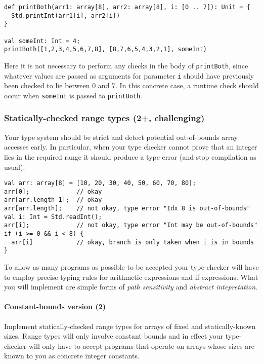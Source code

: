 \begin{lstlisting}
def printBoth(arr1: array[8], arr2: array[8], i: [0 .. 7]): Unit = {
  Std.printInt(arr1[i], arr2[i])
}

val someInt: Int = 4;
printBoth([1,2,3,4,5,6,7,8], [8,7,6,5,4,3,2,1], someInt)
\end{lstlisting}

Here it is not necessary to perform any checks in the body of \lstinline{printBoth}, since
whatever values are passed as arguments for parameter \lstinline{i} should have previously
been checked to lie between 0 and 7.
In this concrete case, a runtime check should occur when \lstinline{someInt} is passed to
\lstinline{printBoth}.


\subsubsection{Statically-checked range types (2+, challenging)}

Your type system should be strict and detect potential out-of-bounds array accesses
early. In particular, when your type checker cannot prove that an integer lies in the
required range it should produce a type error (and stop compilation as usual).

\begin{lstlisting}
val arr: array[8] = [10, 20, 30, 40, 50, 60, 70, 80];
arr[0];             // okay
arr[arr.length-1];  // okay
arr[arr.length];    // not okay, type error "Idx 8 is out-of-bounds"
val i: Int = Std.readInt();
arr[i];             // not okay, type error "Int may be out-of-bounds"
if (i >= 0 && i < 8) {
  arr[i]            // okay, branch is only taken when i is in bounds
}
\end{lstlisting}

To allow as many programs as possible to be accepted your type-checker will have to
employ precise typing rules for arithmetic expressions and if-expressions.
What you will implement are simple forms of \emph{path sensitivity} and
\emph{abstract intepretation}.


\paragraph{Constant-bounds version (2)}

Implement statically-checked range types for arrays of fixed and statically-known sizes.
Range types will only involve constant bounds and in effect your type-checker will only
have to accept programs that operate on arrays whose sizes are known to you as concrete
integer constants.

